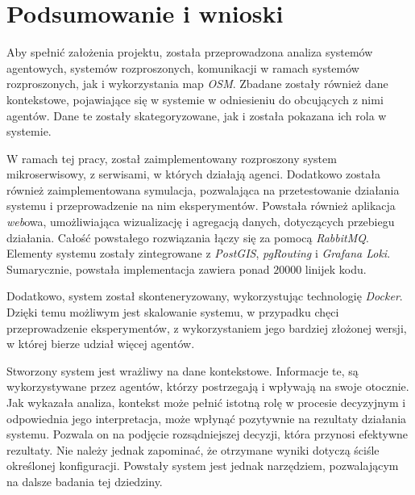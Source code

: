 \chapter{Podsumowanie i wnioski}

\par Aby spełnić założenia projektu, została przeprowadzona analiza systemów agentowych, systemów rozproszonych, komunikacji w ramach systemów rozproszonych, jak i wykorzystania map \emph{OSM}. Zbadane zostały również dane kontekstowe, pojawiające się w systemie w odniesieniu do obcujących z nimi agentów. Dane te zostały skategoryzowane, jak i została pokazana ich rola w systemie.

\par W ramach tej pracy, został zaimplementowany rozproszony system mikroserwisowy, z serwisami, w których działają agenci. Dodatkowo została również zaimplementowana symulacja, pozwalająca na przetestowanie działania systemu i przeprowadzenie na nim eksperymentów. Powstała również aplikacja \emph{web}owa, umożliwiająca wizualizację i agregacją danych, dotyczących przebiegu działania. Całość powstałego rozwiązania łączy się za pomocą \emph{RabbitMQ}. Elementy systemu zostały zintegrowane z \emph{PostGIS}, \emph{pgRouting} i \emph{Grafana Loki}. Sumarycznie, powstała implementacja zawiera ponad $20000$ linijek kodu.

\par Dodatkowo, system został skonteneryzowany, wykorzystując technologię \emph{Docker}. Dzięki temu możliwym jest skalowanie systemu, w przypadku chęci przeprowadzenie eksperymentów, z wykorzystaniem jego bardziej złożonej wersji, w której bierze udział więcej agentów.

\par Stworzony system jest wrażliwy na dane kontekstowe. Informacje te, są wykorzystywane przez agentów, którzy postrzegają i wpływają na swoje otocznie. Jak wykazała analiza, kontekst może pełnić istotną rolę w procesie decyzyjnym i odpowiednia jego interpretacja, może wpłynąć pozytywnie na rezultaty działania systemu. Pozwala on na podjęcie rozsądniejszej decyzji, która przynosi efektywne rezultaty. Nie należy jednak zapominać, że otrzymane wyniki dotyczą ściśle określonej konfiguracji. Powstały system jest jednak narzędziem, pozwalającym na dalsze badania tej dziedziny.